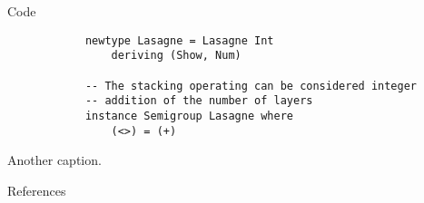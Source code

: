 \documentclass[10pt,aspectratio=169]{beamer}
\begin{document}
\begin{frame}[fragile]{Code}
    \begin{listing}[H]
        \begin{verbatim}
            newtype Lasagne = Lasagne Int
                deriving (Show, Num)

            -- The stacking operating can be considered integer
            -- addition of the number of layers
            instance Semigroup Lasagne where
                (<>) = (+)
        \end{verbatim}
        \caption{Another caption.}
        \label{lst:listing}
    \end{listing}
\end{frame}

\maketitle

\appendix

\begin{frame}[allowframebreaks]{References}
    \nocite{*}
    \printbibliography[heading=none]
\end{frame}
\end{document}
